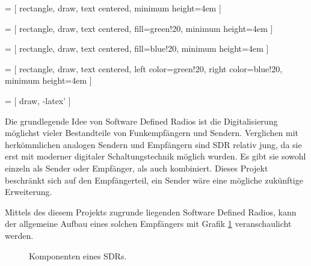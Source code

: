 
 = [
rectangle,
draw,
text centered,
minimum height=4em
]

 = [
rectangle,
draw,
text centered,
fill=green!20,
minimum height=4em
]

 = [
rectangle,
draw,
text centered,
fill=blue!20,
minimum height=4em
]

 = [
rectangle,
draw,
text centered,
left color=green!20,
right color=blue!20,
minimum height=4em
]


 = [
draw,
-latex'
]


Die grundlegende Idee von Software Defined Radios ist die Digitalisierung möglichst vieler Bestandteile von Funkempfängern und Sendern. Verglichen mit herkömmlichen analogen Sendern und Empfängern sind SDR relativ jung, da sie erst mit moderner digitaler Schaltungstechnik möglich wurden. Es gibt sie sowohl einzeln als Sender oder Empfänger, als auch kombiniert. Dieses Projekt beschränkt sich auf den Empfängerteil, ein Sender wäre eine mögliche zukünftige Erweiterung.

Mittels des diesem Projekts zugrunde liegenden Software Defined Radios, kann der allgemeine Aufbau eines solchen Empfängers mit Grafik \ref{fig:SDR_aufbau} veranschaulicht werden.

\begin{figure}[H]
\begin{center}
    \caption{Komponenten eines SDRs.}
    \label{fig:SDR_aufbau}
\end{center}
\end{figure}

